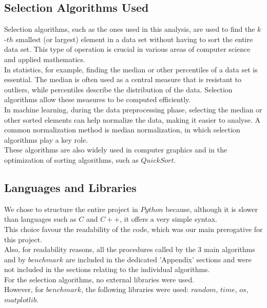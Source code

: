 \documentclass{article}
\begin{document}
\subsection{Selection Algorithms Used}
Selection algorithms, such as the ones used in this analysis, are used to find the $k$-$th$ smallest (or largest) element in a data set without having to sort the entire data set. This type of operation is crucial in various areas of computer science and applied mathematics. \\
In statistics, for example, finding the median or other percentiles of a data set is essential. The median is often used as a central measure that is resistant to outliers, while percentiles describe the distribution of the data. Selection algorithms allow these measures to be computed efficiently.\\
In machine learning, during the data preprocessing phase, selecting the median or other sorted elements can help normalize the data, making it easier to analyse. A common normalization method is median normalization, in which selection algorithms play a key role.\\
These algorithms are also widely used in computer graphics and in the optimization of sorting algorithms, such as $QuickSort$.

\subsection{Languages and Libraries}
We chose to structure the entire project in $Python$ because, although it is slower than languages such as $C$ and $C++$, it offers a very simple syntax.\\
This choice favour the readability of the code, which was our main prerogative for this project.\\
Also, for readability reasons, all the procedures called by the 3 main algorithms and by $benchmark$ are included in the dedicated 'Appendix' sections and were not included in the sections relating to the individual algorithms.\\
For the selection algorithms, no external libraries were used.\\
However, for $benchmark$, the following libraries were used: $random$, $time$, $os$, $matplotlib$.
\end{document}
